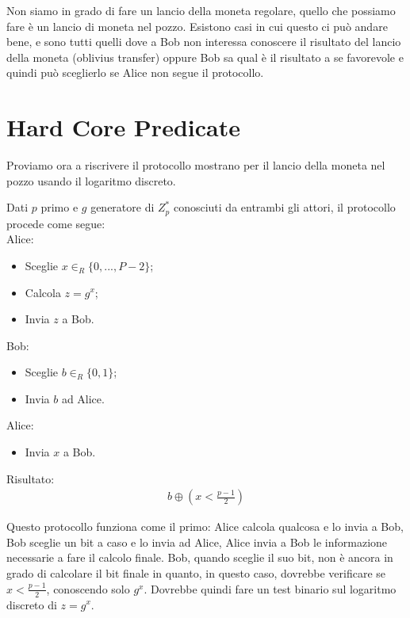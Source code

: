 \noindent Non siamo in grado di fare un lancio della moneta regolare, quello che possiamo fare è un lancio di moneta nel pozzo. Esistono casi in cui questo ci può andare bene, e sono tutti quelli dove a Bob non interessa conoscere il risultato del lancio della moneta (oblivius transfer) oppure Bob sa qual è il risultato a se favorevole e quindi può sceglierlo se Alice non segue il protocollo. 

\section{Hard Core Predicate}
Proviamo ora a riscrivere il protocollo mostrano per il lancio della moneta nel pozzo usando il logaritmo discreto.

Dati $p$ primo e $g$ generatore di $Z_p^*$ conosciuti da entrambi gli attori, il protocollo procede come segue:\\

\noindent Alice:
\begin{itemize}
    \item Sceglie $x \in_R \{0, ..., P-2\}$;
    \item Calcola $z= g^x$;
    \item Invia $z$ a Bob.
\end{itemize}

\noindent Bob:
\begin{itemize}
    \item Sceglie $b \in_R \{0, 1\}$;
    \item Invia $b$ ad Alice. 
\end{itemize}

\noindent Alice:
\begin{itemize}
    \item Invia $x$ a Bob.
\end{itemize}

\noindent Risultato: 
\begin{align*}
    b \oplus \left( x < \frac{p-1}{2}\right)
\end{align*}

\noindent Questo protocollo funziona come il primo: Alice calcola qualcosa e lo invia a Bob, Bob sceglie un bit a caso e lo invia ad Alice, Alice invia a Bob le informazione necessarie a fare il calcolo finale. Bob, quando sceglie il suo bit, non è ancora in grado di calcolare il bit finale in quanto, in questo caso, dovrebbe verificare se $x < \frac{p-1}{2}$, conoscendo solo $g^x$. Dovrebbe quindi fare un test binario sul logaritmo discreto di $z = g^x$. 
 
